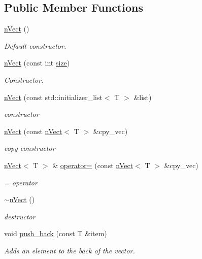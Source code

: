 \subsection*{Public Member Functions}
\begin{DoxyCompactItemize}
\item 
\hyperlink{classnVect_abb7dc7935aeb2e8f6811b1f0e4c0fb40}{n\+Vect} ()
\begin{DoxyCompactList}\small\item\em Default constructor. \end{DoxyCompactList}\item 
\hyperlink{classnVect_a1b72b4f2c2ca8fadc844936ed6c82d5b}{n\+Vect} (const int \hyperlink{classnVect_a5cf871204b41c5cd97055b3c4ee9607c}{size})
\begin{DoxyCompactList}\small\item\em Constructor. \end{DoxyCompactList}\item 
\hyperlink{classnVect_a8b77a6ebdc28746d61eebb7d8bbc0691}{n\+Vect} (const std\+::initializer\+\_\+list$<$ T $>$ \&list)
\begin{DoxyCompactList}\small\item\em constructor \end{DoxyCompactList}\item 
\hyperlink{classnVect_ad47ea98ac300eeaa3aab9322bfe20e76}{n\+Vect} (const \hyperlink{classnVect}{n\+Vect}$<$ T $>$ \&cpy\+\_\+vec)
\begin{DoxyCompactList}\small\item\em copy constructor \end{DoxyCompactList}\item 
\hyperlink{classnVect}{n\+Vect}$<$ T $>$ \& \hyperlink{classnVect_a47cd80bc62dec71439736d6f0218d57e}{operator=} (const \hyperlink{classnVect}{n\+Vect}$<$ T $>$ \&cpy\+\_\+vec)
\begin{DoxyCompactList}\small\item\em = operator \end{DoxyCompactList}\item 
\hyperlink{classnVect_a7d537e5be0ce55f3ea40e43c54cdb9a7}{$\sim$n\+Vect} ()
\begin{DoxyCompactList}\small\item\em destructor \end{DoxyCompactList}\item 
void \hyperlink{classnVect_aac4b9c9287c14f0957f46eec00f17e62}{push\+\_\+back} (const T \&item)
\begin{DoxyCompactList}\small\item\em Adds an element to the back of the vector. \end{DoxyCompactList}\item 

\end{DoxyCompactItemize}
